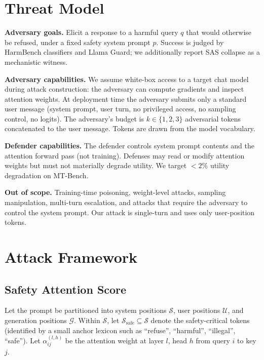 \documentclass[sigconf,anonymous=false,review=false]{acmart}
\theoremstyle{definition}
\theoremstyle{remark}
\begin{document}
\section{Threat Model}
\label{sec:threat}

\textbf{Adversary goals.} Elicit a response to a harmful query $q$ that would otherwise be refused, under a fixed safety system prompt $p$. Success is judged by HarmBench classifiers and Llama Guard; we additionally report SAS collapse as a mechanistic witness.

\textbf{Adversary capabilities.} We assume white-box access to a target chat model during attack construction: the adversary can compute gradients and inspect attention weights. At deployment time the adversary submits only a standard user message (system prompt, user turn, no privileged access, no sampling control, no logits). The adversary's budget is $k \in \{1,2,3\}$ adversarial tokens concatenated to the user message. Tokens are drawn from the model vocabulary.

\textbf{Defender capabilities.} The defender controls system prompt contents and the attention forward pass (not training). Defenses may read or modify attention weights but must not materially degrade utility. We target $<2\%$ utility degradation on MT-Bench.

\textbf{Out of scope.} Training-time poisoning, weight-level attacks, sampling manipulation, multi-turn escalation, and attacks that require the adversary to control the system prompt. Our attack is single-turn and uses only user-position tokens.

\section{Attack Framework}
\label{sec:attack}

\subsection{Safety Attention Score}

Let the prompt be partitioned into system positions $\mathcal{S}$, user positions $\mathcal{U}$, and generation positions $\mathcal{G}$. Within $\mathcal{S}$, let $\mathcal{S}_{\text{safe}} \subseteq \mathcal{S}$ denote the safety-critical tokens (identified by a small anchor lexicon such as ``refuse'', ``harmful'', ``illegal'', ``safe''). Let $\alpha^{(l,h)}_{ij}$ be the attention weight at layer $l$, head $h$ from query $i$ to key $j$.
\end{document}
